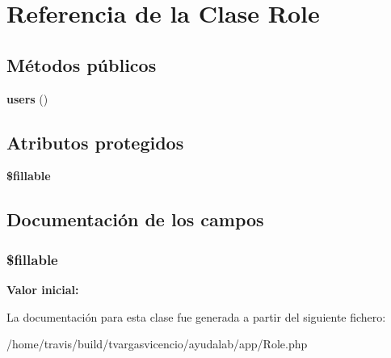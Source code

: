 \hypertarget{class_app_1_1_role}{\section{\-Referencia de la \-Clase \-Role}
\label{class_app_1_1_role}
}
\subsection*{\-Métodos públicos}
\begin{DoxyCompactItemize}
\item 
\hypertarget{class_app_1_1_role_ae97d8e719525c3493e02d63c6373a11b}{{\bfseries users} ()}\label{class_app_1_1_role_ae97d8e719525c3493e02d63c6373a11b}

\end{DoxyCompactItemize}
\subsection*{\-Atributos protegidos}
\begin{DoxyCompactItemize}
\item 
{\bfseries \$fillable}
\end{DoxyCompactItemize}


\subsection{\-Documentación de los campos}
\hypertarget{class_app_1_1_role_a6a90e74ccdf5efd70d51d10c906f8e32}{
\subsubsection[{\$fillable}]{\setlength{\rightskip}{0pt plus 5cm}\$fillable}}\label{class_app_1_1_role_a6a90e74ccdf5efd70d51d10c906f8e32}
{\bfseries \-Valor inicial\-:}
\begin{DoxyCode}
\end{DoxyCode}


\-La documentación para esta clase fue generada a partir del siguiente fichero\-:\begin{DoxyCompactItemize}
\item 
/home/travis/build/tvargasvicencio/ayudalab/app/\-Role.\-php\end{DoxyCompactItemize}

